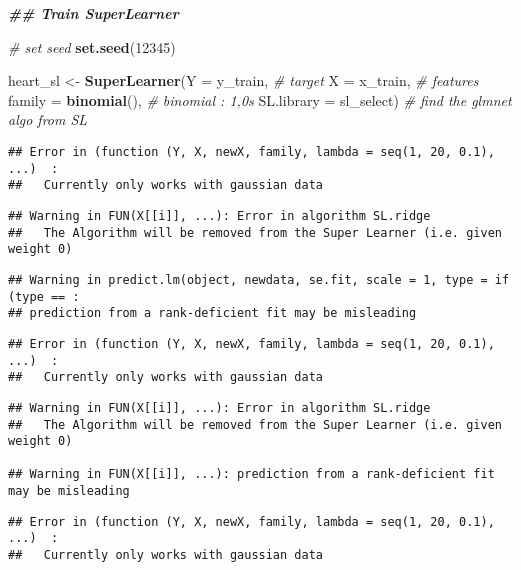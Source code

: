 \documentclass[
]{article}
\newenvironment{Shaded}{\begin{snugshade}}{\end{snugshade}}
\newcommand{\AttributeTok}[1]{\textcolor[rgb]{0.13,0.29,0.53}{#1}}
\newcommand{\CommentTok}[1]{\textcolor[rgb]{0.56,0.35,0.01}{\textit{#1}}}
\newcommand{\DecValTok}[1]{\textcolor[rgb]{0.00,0.00,0.81}{#1}}
\newcommand{\DocumentationTok}[1]{\textcolor[rgb]{0.56,0.35,0.01}{\textbf{\textit{#1}}}}
\newcommand{\FunctionTok}[1]{\textcolor[rgb]{0.13,0.29,0.53}{\textbf{#1}}}
\newcommand{\NormalTok}[1]{#1}
\newcommand{\OtherTok}[1]{\textcolor[rgb]{0.56,0.35,0.01}{#1}}
\begin{document}
\begin{Shaded}
\begin{Highlighting}[]
\DocumentationTok{\#\# Train SuperLearner}

\CommentTok{\# set seed}
\FunctionTok{set.seed}\NormalTok{(}\DecValTok{12345}\NormalTok{)}


\NormalTok{heart\_sl }\OtherTok{\textless{}{-}} \FunctionTok{SuperLearner}\NormalTok{(}\AttributeTok{Y =}\NormalTok{ y\_train,              }\CommentTok{\# target}
                         \AttributeTok{X =}\NormalTok{ x\_train,              }\CommentTok{\# features}
                         \AttributeTok{family =} \FunctionTok{binomial}\NormalTok{(),      }\CommentTok{\# binomial : 1,0s}
                         \AttributeTok{SL.library =}\NormalTok{ sl\_select) }\CommentTok{\# find the glmnet algo from SL}
\end{Highlighting}
\end{Shaded}

\begin{verbatim}
## Error in (function (Y, X, newX, family, lambda = seq(1, 20, 0.1), ...)  : 
##   Currently only works with gaussian data
\end{verbatim}

\begin{verbatim}
## Warning in FUN(X[[i]], ...): Error in algorithm SL.ridge 
##   The Algorithm will be removed from the Super Learner (i.e. given weight 0)
\end{verbatim}

\begin{verbatim}
## Warning in predict.lm(object, newdata, se.fit, scale = 1, type = if (type == :
## prediction from a rank-deficient fit may be misleading
\end{verbatim}

\begin{verbatim}
## Error in (function (Y, X, newX, family, lambda = seq(1, 20, 0.1), ...)  : 
##   Currently only works with gaussian data
\end{verbatim}

\begin{verbatim}
## Warning in FUN(X[[i]], ...): Error in algorithm SL.ridge 
##   The Algorithm will be removed from the Super Learner (i.e. given weight 0)

## Warning in FUN(X[[i]], ...): prediction from a rank-deficient fit may be misleading
\end{verbatim}

\begin{verbatim}
## Error in (function (Y, X, newX, family, lambda = seq(1, 20, 0.1), ...)  : 
##   Currently only works with gaussian data
\end{verbatim}
\end{document}
